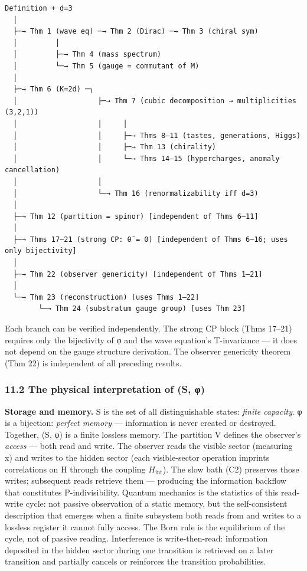 \documentclass[
  11pt,
]{article}
\begin{document}
\begin{verbatim}
Definition + d=3
  │
  ├─→ Thm 1 (wave eq) ─→ Thm 2 (Dirac) ─→ Thm 3 (chiral sym)
  │         │
  │         ├─→ Thm 4 (mass spectrum)
  │         └─→ Thm 5 (gauge = commutant of M)
  │
  ├─→ Thm 6 (K=2d) ─┐
  │                   ├─→ Thm 7 (cubic decomposition → multiplicities (3,2,1))
  │                   │     │
  │                   │     ├─→ Thms 8–11 (tastes, generations, Higgs)
  │                   │     ├─→ Thm 13 (chirality)
  │                   │     └─→ Thms 14–15 (hypercharges, anomaly cancellation)
  │                   │
  │                   └─→ Thm 16 (renormalizability iff d=3)
  │
  ├─→ Thm 12 (partition = spinor) [independent of Thms 6–11]
  │
  ├─→ Thms 17–21 (strong CP: θ̄ = 0) [independent of Thms 6–16; uses only bijectivity]
  │
  ├─→ Thm 22 (observer genericity) [independent of Thms 1–21]
  │
  └─→ Thm 23 (reconstruction) [uses Thms 1–22]
        └─→ Thm 24 (substratum gauge group) [uses Thm 23]
\end{verbatim}

Each branch can be verified independently. The strong CP block (Thms
17--21) requires only the bijectivity of φ and the wave equation's
T-invariance --- it does not depend on the gauge structure derivation.
The observer genericity theorem (Thm 22) is independent of all preceding
results.

\hypertarget{the-physical-interpretation-of-s-ux3c6}{%
\subsubsection{11.2 The physical interpretation of (S,
φ)}\label{the-physical-interpretation-of-s-ux3c6}}

\textbf{Storage and memory.} S is the set of all distinguishable states:
\emph{finite capacity}. φ is a bijection: \emph{perfect memory} ---
information is never created or destroyed. Together, (S, φ) is a finite
lossless memory. The partition V defines the observer's \emph{access}
--- both read and write. The observer reads the visible sector
(measuring x) and writes to the hidden sector (each visible-sector
operation imprints correlations on H through the coupling
\(H_{\text{int}}\)). The slow bath (C2) preserves those writes;
subsequent reads retrieve them --- producing the information backflow
that constitutes P-indivisibility. Quantum mechanics is the statistics
of this read-write cycle: not passive observation of a static memory,
but the self-consistent description that emerges when a finite subsystem
both reads from and writes to a lossless register it cannot fully
access. The Born rule is the equilibrium of the cycle, not of passive
reading. Interference is write-then-read: information deposited in the
hidden sector during one transition is retrieved on a later transition
and partially cancels or reinforces the transition probabilities.
\end{document}
